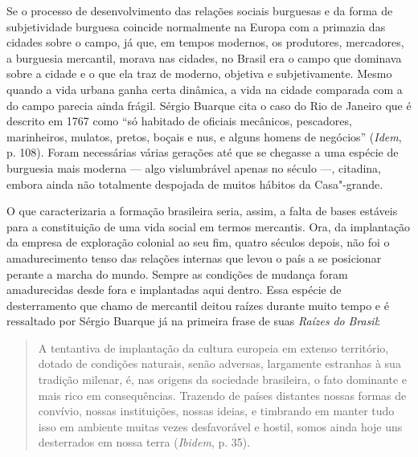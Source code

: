 Se o processo de desenvolvimento das relações sociais burguesas e da
forma de subjetividade burguesa coincide normalmente na Europa com a
primazia das cidades sobre o campo, já que, em tempos modernos, os
produtores, mercadores, a burguesia mercantil, morava nas cidades, no
Brasil era o campo que dominava sobre a cidade e o que ela traz de
moderno, objetiva e subjetivamente. Mesmo quando a vida urbana ganha
certa dinâmica, a vida na cidade comparada com a do campo parecia ainda
frágil. Sérgio Buarque cita o caso do Rio de Janeiro que é descrito em
1767 como ``só habitado de oficiais mecânicos, pescadores, marinheiros,
mulatos, pretos, boçais e nus, e alguns homens de negócios'' (\emph{Idem}, p. 108). Foram
necessárias várias gerações até que se chegasse a uma espécie de
burguesia mais moderna --- algo vislumbrável apenas no século  ---,
citadina, embora ainda não totalmente despojada de muitos hábitos da
Casa"-grande.

O que caracterizaria a formação brasileira seria, assim, a falta de
bases estáveis para a constituição de uma vida social em termos
mercantis. Ora, da implantação da empresa de exploração colonial ao seu
fim, quatro séculos depois, não foi o amadurecimento tenso das relações
internas que levou o país a se posicionar perante a marcha do mundo.
Sempre as condições de mudança foram amadurecidas desde fora e
implantadas aqui dentro. Essa espécie de desterramento que chamo de mercantil deitou
raízes durante muito tempo e é ressaltado por Sérgio Buarque já na
primeira frase de suas \emph{Raízes} \emph{do} \emph{Brasil}:

\begin{quote}
A tentantiva de implantação da cultura europeia em extenso território,
dotado de condições naturais, senão adversas, largamente estranhas à sua
tradição milenar, é, nas origens da sociedade brasileira, o fato
dominante e mais rico em consequências. Trazendo de países distantes
nossas formas de convívio, nossas instituições, nossas ideias, e
timbrando em manter tudo isso em ambiente muitas vezes desfavorável e
hostil, somos ainda hoje uns desterrados em nossa terra (\emph{Ibidem}, p. 35).
\end{quote}

